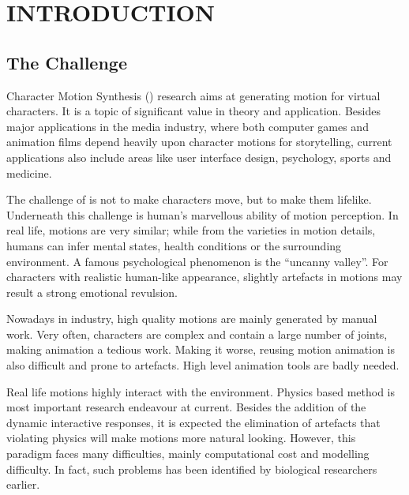 \chapter{INTRODUCTION}
\label{chap:intro}

\graphicspath{{Introduction/IntroductionFigs/EPS/}{Introduction/IntroductionFigs/}}

\section{The Challenge}
Character Motion Synthesis (\cms) research aims at generating motion for virtual characters.
It is a topic of significant value in theory and application. 
Besides major applications in the media industry, where both computer games and animation films depend heavily upon character motions for storytelling, 
current applications also include  areas like user interface design, psychology, sports and medicine.

The challenge of \cms  is not to make characters move, but  to make them lifelike. 
Underneath this challenge is human's marvellous ability of motion perception. 
In real life, motions are very similar; 
while from the varieties in motion details, humans can infer mental states, health conditions or the surrounding environment.
A famous psychological phenomenon is the ``uncanny valley''.
For characters with realistic human-like appearance, slightly artefacts in motions may result a strong emotional revulsion.



Nowadays in industry, high quality motions are mainly generated by manual work. 
Very often, characters are complex and contain a large number of joints, making animation a tedious work.
Making it worse, reusing motion animation is also difficult and prone to artefacts.
High level animation tools are badly needed. 

Real life motions highly interact with the environment.
Physics based method  is most important research endeavour at current.
Besides  the addition of the dynamic interactive responses, it is  expected  the elimination of  artefacts that violating physics  will make motions more natural looking.
However, this paradigm faces many difficulties, mainly computational cost and modelling difficulty.
In fact, such problems has been identified by biological researchers earlier.


